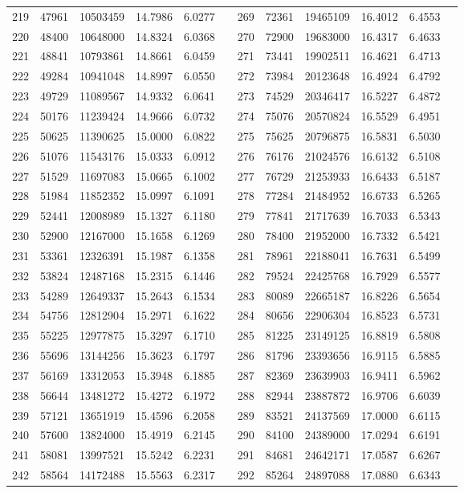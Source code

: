 \begin{longtable}{SSSSSSSSSSSS}
219&47961&10503459&14.7986&6.0277&&269&72361&19465109&16.4012&6.4553\\
220&48400&10648000&14.8324&6.0368&&270&72900&19683000&16.4317&6.4633\\
221&48841&10793861&14.8661&6.0459&&271&73441&19902511&16.4621&6.4713\\
222&49284&10941048&14.8997&6.0550&&272&73984&20123648&16.4924&6.4792\\
223&49729&11089567&14.9332&6.0641&&273&74529&20346417&16.5227&6.4872\\
224&50176&11239424&14.9666&6.0732&&274&75076&20570824&16.5529&6.4951\\
225&50625&11390625&15.0000&6.0822&&275&75625&20796875&16.5831&6.5030\\
226&51076&11543176&15.0333&6.0912&&276&76176&21024576&16.6132&6.5108\\
227&51529&11697083&15.0665&6.1002&&277&76729&21253933&16.6433&6.5187\\
228&51984&11852352&15.0997&6.1091&&278&77284&21484952&16.6733&6.5265\\
229&52441&12008989&15.1327&6.1180&&279&77841&21717639&16.7033&6.5343\\
230&52900&12167000&15.1658&6.1269&&280&78400&21952000&16.7332&6.5421\\
231&53361&12326391&15.1987&6.1358&&281&78961&22188041&16.7631&6.5499\\
232&53824&12487168&15.2315&6.1446&&282&79524&22425768&16.7929&6.5577\\
233&54289&12649337&15.2643&6.1534&&283&80089&22665187&16.8226&6.5654\\
234&54756&12812904&15.2971&6.1622&&284&80656&22906304&16.8523&6.5731\\
235&55225&12977875&15.3297&6.1710&&285&81225&23149125&16.8819&6.5808\\
236&55696&13144256&15.3623&6.1797&&286&81796&23393656&16.9115&6.5885\\
237&56169&13312053&15.3948&6.1885&&287&82369&23639903&16.9411&6.5962\\
238&56644&13481272&15.4272&6.1972&&288&82944&23887872&16.9706&6.6039\\
239&57121&13651919&15.4596&6.2058&&289&83521&24137569&17.0000&6.6115\\
240&57600&13824000&15.4919&6.2145&&290&84100&24389000&17.0294&6.6191\\
241&58081&13997521&15.5242&6.2231&&291&84681&24642171&17.0587&6.6267\\
242&58564&14172488&15.5563&6.2317&&292&85264&24897088&17.0880&6.6343\\

\end{longtable}
